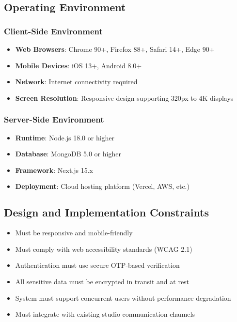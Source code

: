 \documentclass[12pt,a4paper]{article}
\begin{document}
\subsection{Operating Environment}
\subsubsection{Client-Side Environment}
\begin{itemize}
    \item \textbf{Web Browsers}: Chrome 90+, Firefox 88+, Safari 14+, Edge 90+
    \item \textbf{Mobile Devices}: iOS 13+, Android 8.0+
    \item \textbf{Network}: Internet connectivity required
    \item \textbf{Screen Resolution}: Responsive design supporting 320px to 4K displays
\end{itemize}

\subsubsection{Server-Side Environment}
\begin{itemize}
    \item \textbf{Runtime}: Node.js 18.0 or higher
    \item \textbf{Database}: MongoDB 5.0 or higher
    \item \textbf{Framework}: Next.js 15.x
    \item \textbf{Deployment}: Cloud hosting platform (Vercel, AWS, etc.)
\end{itemize}

\subsection{Design and Implementation Constraints}
\begin{itemize}
    \item Must be responsive and mobile-friendly
    \item Must comply with web accessibility standards (WCAG 2.1)
    \item Authentication must use secure OTP-based verification
    \item All sensitive data must be encrypted in transit and at rest
    \item System must support concurrent users without performance degradation
    \item Must integrate with existing studio communication channels
\end{itemize}
\end{document}
